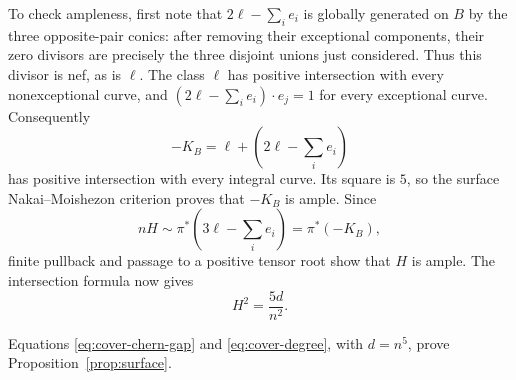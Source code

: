 To check ampleness, first note that $2\ell-\sum_i e_i$ is globally
generated on $B$ by the three opposite-pair conics: after removing
their exceptional components, their zero divisors are precisely the
three disjoint unions just considered.  Thus this divisor is nef, as
is $\ell$.  The class $\ell$ has positive intersection with every
nonexceptional curve, and
$(2\ell-\sum_i e_i)\cdot e_j=1$ for every exceptional curve.
Consequently
\[
 -K_B=\ell+\left(2\ell-\sum_i e_i\right)
\]
has positive intersection with every integral curve.  Its square is
$5$, so the surface Nakai--Moishezon criterion
\cite[Chapter~V, Theorem~1.10]{Hartshorne} proves that $-K_B$ is
ample. Since
\[
 nH\sim\pi^*\left(3\ell-\sum_i e_i\right)=\pi^*(-K_B),
\]
finite pullback and passage to a positive tensor root
\cite[Tags~0892 and 01PT]{Stacks} show that $H$ is
ample. The intersection formula now gives
\begin{equation}\label{eq:cover-degree}
 H^2=\frac{5d}{n^2}.
\end{equation}

Equations \eqref{eq:cover-chern-gap} and \eqref{eq:cover-degree},
with $d=n^5$, prove Proposition~\ref{prop:surface}.
